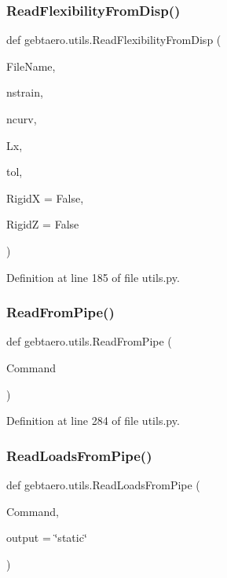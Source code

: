 \subsubsection{\texorpdfstring{Read\+Flexibility\+From\+Disp()}{ReadFlexibilityFromDisp()}}
{\footnotesize\ttfamily def gebtaero.\+utils.\+Read\+Flexibility\+From\+Disp (\begin{DoxyParamCaption}\item[{}]{File\+Name,  }\item[{}]{nstrain,  }\item[{}]{ncurv,  }\item[{}]{Lx,  }\item[{}]{tol,  }\item[{}]{RigidX = {\ttfamily False},  }\item[{}]{RigidZ = {\ttfamily False} }\end{DoxyParamCaption})}



Definition at line 185 of file utils.\+py.

\mbox{\label{namespacegebtaero_1_1utils_ad35c5461b34c42fdf3fb6abb8c21a46d}} 
\subsubsection{\texorpdfstring{Read\+From\+Pipe()}{ReadFromPipe()}}
{\footnotesize\ttfamily def gebtaero.\+utils.\+Read\+From\+Pipe (\begin{DoxyParamCaption}\item[{}]{Command }\end{DoxyParamCaption})}



Definition at line 284 of file utils.\+py.

\mbox{\label{namespacegebtaero_1_1utils_ad2812937cff40c12f0af963ab0b429b6}} 
\subsubsection{\texorpdfstring{Read\+Loads\+From\+Pipe()}{ReadLoadsFromPipe()}}
{\footnotesize\ttfamily def gebtaero.\+utils.\+Read\+Loads\+From\+Pipe (\begin{DoxyParamCaption}\item[{}]{Command,  }\item[{}]{output = {\ttfamily \char`\"{}static\char`\"{}} }\end{DoxyParamCaption})}



